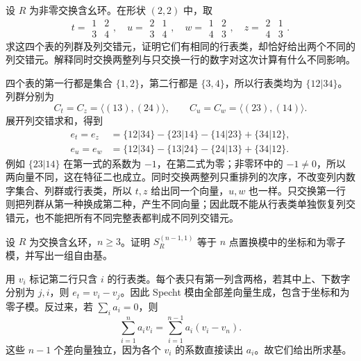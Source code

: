 \begin{exercise}\label{b5:ex:06-same-tabloid}
	设 \(R\) 为非零交换含幺环。在形状 \((2,2)\) 中，取
	\[
		t=\begin{array}{cc}1&2\\3&4\end{array},\quad
		u=\begin{array}{cc}2&1\\3&4\end{array},\quad
		w=\begin{array}{cc}1&2\\4&3\end{array},\quad
		z=\begin{array}{cc}2&1\\4&3\end{array}.
	\]
	求这四个表的列群及列交错元，证明它们有相同的行表类，却恰好给出两个不同的列交错元。解释同时交换两整列与只交换一行的数字对这次计算有什么不同影响。
\end{exercise}
\begin{solution}
	四个表的第一行都是集合 \(\{1,2\}\)，第二行都是 \(\{3,4\}\)，所以行表类均为 \(\{12|34\}\)。列群分别为
	\[
		C_t=C_z=\langle(13),(24)\rangle,\qquad C_u=C_w=\langle(23),(14)\rangle.
	\]
	展开列交错求和，得到
	\[
		\begin{aligned}
			e_t=e_z&=\{12|34\}-\{23|14\}-\{14|23\}+\{34|12\},\\
			e_u=e_w&=\{12|34\}-\{13|24\}-\{24|13\}+\{34|12\}.
		\end{aligned}
	\]
	例如 \(\{23|14\}\) 在第一式的系数为 \(-1\)，在第二式为零；非零环中的 \(-1\ne0\)，所以两向量不同，这在特征二也成立。同时交换两整列只重排列的次序，不改变列内数字集合、列群或行表类，所以 \(t,z\) 给出同一个向量，\(u,w\) 也一样。只交换第一行则把列群从第一种换成第二种，产生不同向量；因此既不能从行表类单独恢复列交错元，也不能把所有不同完整表都判成不同列交错元。
\end{solution}

\begin{exercise}\label{b5:ex:06-standard-hook-module}
	设 \(R\) 为交换含幺环，\(n\geq3\)。证明 \(S_R^{(n-1,1)}\) 等于 \(n\) 点置换模中的坐标和为零子模，并写出一组自由基。
\end{exercise}
\begin{solution}
	用 \(v_i\) 标记第二行只含 \(i\) 的行表类。每个表只有第一列含两格，若其中上、下数字分别为 \(j,i\)，则 \(e_t=v_i-v_j\)。因此 Specht 模由全部差向量生成，包含于坐标和为零子模。反过来，若 \(\sum_i a_i=0\)，则
	\[
		\sum_{i=1}^n a_iv_i=\sum_{i=1}^{n-1}a_i(v_i-v_n).
	\]
	这些 \(n-1\) 个差向量独立，因为各个 \(v_i\) 的系数直接读出 \(a_i\)。故它们给出所求基。
\end{solution}

